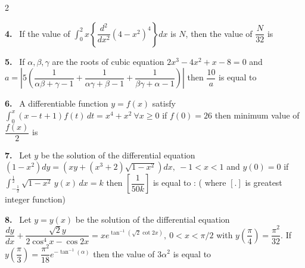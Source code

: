 \documentclass[10pt]{extarticle}
\newcommand{\qn}[1]{\par\smallskip\noindent\textbf{#1.}~}
\begin{document}
\begin{multicols}{2}
\qn{4} If the value of $\displaystyle\int_0^2x\left\{\dfrac{d^2}{dx^2}\left(4-x^2\right)^4\right\}dx$ is $N$, then the value of $\dfrac N{32}$ is
\qn{5} If $\alpha,\beta,\gamma$ are the roots of cubic equation $2x^3-4x^2+x-8=0$ and $a=\left|5\left(\dfrac1{\alpha\beta+\gamma-1}+\dfrac1{\alpha\gamma+\beta-1}+\dfrac1{\beta\gamma+\alpha-1}\right)\right|$ then $\dfrac{10}a$ is equal to
\qn{6} A differentiable function $y=f(x)$ satisfy $\displaystyle\int_0^x(x-t+1)f(t)\,dt=x^4+x^2\ \forall x\geqslant0$ if $f(0)=26$ then minimum value of $\dfrac{f(x)}2$ is \underline{\hspace{1cm}}
\qn{7} Let $y$ be the solution of the differential equation $\left(1-x^2\right)dy=\left(xy+\left(x^3+2\right)\sqrt{1-x^2}\right)dx,\ -1<x<1$ and $y(0)=0$ if $\displaystyle\int_{-\frac12}^{\frac12}\sqrt{1-x^2}\,y(x)\,dx=k$ then $\left[\dfrac1{50k}\right]$ is equal to : ( where $[.]$ is greatest integer function)
\qn{8} Let $y=y(x)$ be the solution of the differential equation $\dfrac{dy}{dx}+\dfrac{\sqrt2y}{2\cos^4x-\cos2x}=xe^{\tan^{-1}\left(\sqrt2\cot2x\right)},\ 0<x<\pi/2$ with $y\left(\dfrac\pi4\right)=\dfrac{\pi^2}{32}$. If $y\left(\dfrac\pi3\right)=\dfrac{\pi^2}{18}e^{-\tan^{-1}(\alpha)}$ then the value of $3\alpha^2$ is equal to \underline{\hspace{1cm}}
\end{multicols}
\end{document}
